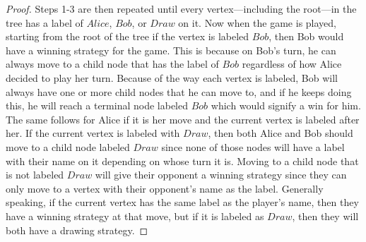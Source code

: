 \documentclass[11pt]{article}
\begin{document}
\begin{proof}
	Steps 1-3 are then repeated until every vertex—including the root—in the tree has a label of $Alice$, $Bob$, or $Draw$ on it. Now when the game is played, starting from the root of the tree if the vertex is labeled $Bob$, then Bob would have a winning strategy for the game. This is because on Bob's turn, he can always move to a child node that has the label of $Bob$ regardless of how Alice decided to play her turn. Because of the way each vertex is labeled, Bob will always have one or more child nodes that he can move to, and if he keeps doing this, he will reach a terminal node labeled $Bob$ which would signify a win for him. The same follows for Alice if it is her move and the current vertex is labeled after her. If the current vertex is labeled with $Draw$, then both Alice and Bob should move to a child node labeled $Draw$ since none of those nodes will have a label with their name on it depending on whose turn it is. Moving to a child node that is not labeled $Draw$ will give their opponent a winning strategy since they can only move to a vertex with their opponent's name as the label. Generally speaking, if the current vertex has the same label as the player's name, then they have a winning strategy at that move, but if it is labeled as $Draw$, then they will both have a drawing strategy.
\end{proof}
\end{document}
